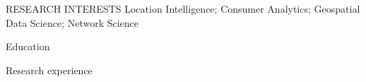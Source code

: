 %
%
%
%
\def\lang{eng}






\begin{rSection}{RESEARCH INTERESTS}
    Location Intelligence; Consumer Analytics; Geospatial Data Science; Network Science
\end{rSection}

\begin{rSection}{Education}
	
	
	
\end{rSection}

\begin{rSection}{Research experience}
	
	
	
	
	
\end{rSection}



% 





